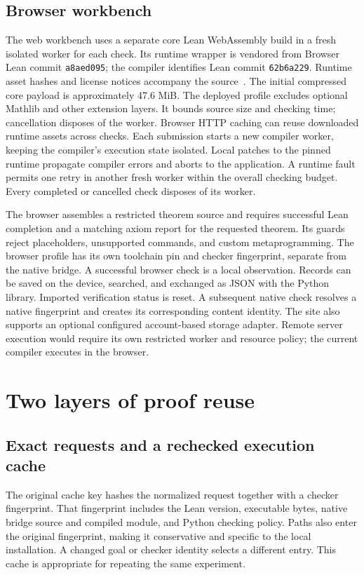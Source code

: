 \documentclass[10pt,a4paper]{article}
\newcommand{\code}[1]{\texttt{#1}}
\begin{document}
\subsection{Browser workbench}
The web workbench uses a separate core Lean WebAssembly build in a fresh
isolated worker for each check. Its runtime wrapper is vendored from Browser Lean commit
\code{a8aed095}; the compiler identifies Lean commit \code{62b6a229}.
Runtime asset hashes and license notices accompany the source~\cite{browserlean}.
The initial compressed core payload is approximately 47.6 MiB. The deployed
profile excludes optional Mathlib and other extension layers. It bounds source
size and checking time; cancellation disposes of the worker. Browser HTTP
caching can reuse downloaded runtime assets across checks. Each submission
starts a new compiler worker, keeping the compiler's execution state isolated.
Local patches to the pinned runtime propagate compiler errors and aborts to
the application. A runtime fault permits one retry in another fresh worker
within the overall checking budget. Every completed or cancelled check
disposes of its worker.

The browser assembles a restricted theorem source and requires successful Lean
completion and a matching axiom report for the requested theorem. Its guards
reject placeholders, unsupported commands, and custom metaprogramming. The
browser profile has its own toolchain pin and checker fingerprint, separate
from the native bridge. A successful browser check is a local observation.
Records can be saved on the device, searched, and exchanged as JSON with the
Python library. Imported verification status is reset. A subsequent native
check resolves a native fingerprint and creates its corresponding content
identity. The site also supports an optional configured account-based storage
adapter. Remote server execution would require its own restricted worker and
resource policy; the current compiler executes in the browser.

\section{Two layers of proof reuse}
\subsection{Exact requests and a rechecked execution cache}
The original cache key hashes the normalized request together with a checker
fingerprint. That fingerprint includes the Lean version, executable bytes,
native bridge source and compiled module, and Python checking policy. Paths
also enter the original fingerprint, making it conservative and specific to the
local installation. A changed goal or checker identity selects a different
entry. This cache is appropriate for repeating the same experiment.
\end{document}
